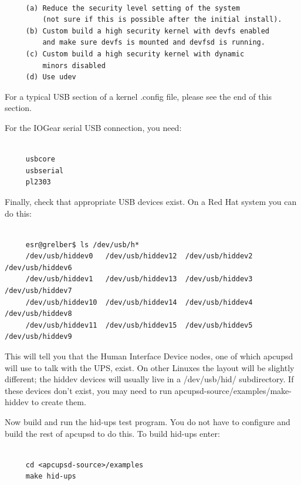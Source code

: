 \footnotesize
\begin{verbatim}
     
     (a) Reduce the security level setting of the system
         (not sure if this is possible after the initial install).
     (b) Custom build a high security kernel with devfs enabled
         and make sure devfs is mounted and devfsd is running.
     (c) Custom build a high security kernel with dynamic
         minors disabled
     (d) Use udev
\end{verbatim}
\normalsize

For a typical USB section of a kernel .config file, please see the end of this
section.  

For the IOGear serial USB connection, you need: 

\footnotesize
\begin{verbatim}
     
     usbcore
     usbserial
     pl2303
\end{verbatim}
\normalsize

Finally, check that appropriate USB devices exist.  On a Red Hat system you
can do this: 

\footnotesize
\begin{verbatim}
     
     esr@grelber$ ls /dev/usb/h*
     /dev/usb/hiddev0   /dev/usb/hiddev12  /dev/usb/hiddev2  /dev/usb/hiddev6
     /dev/usb/hiddev1   /dev/usb/hiddev13  /dev/usb/hiddev3  /dev/usb/hiddev7
     /dev/usb/hiddev10  /dev/usb/hiddev14  /dev/usb/hiddev4  /dev/usb/hiddev8
     /dev/usb/hiddev11  /dev/usb/hiddev15  /dev/usb/hiddev5  /dev/usb/hiddev9
\end{verbatim}
\normalsize

This will tell you that the Human Interface Device nodes, one of which apcupsd
will use to talk with the UPS, exist.  On other Linuxes the layout will be
slightly different; the hiddev devices will usually live in a /dev/usb/hid/
subdirectory. If these devices don't exist, you may need to run
\lt{}apcupsd-source\gt{}/examples/make-hiddev to create them.  

Now build and run the hid-ups test program. You do not have to configure and
build the rest of apcupsd to do this.  To build hid-ups enter: 

\footnotesize
\begin{verbatim}
     
     cd <apcupsd-source>/examples
     make hid-ups
\end{verbatim}
\normalsize

